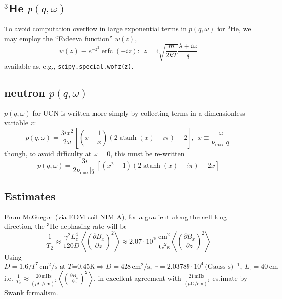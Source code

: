 \documentclass[11pt,english]{article}
\begin{document}
\subsection{$^3$He $p(q,\omega)$}

To avoid computation overflow in large exponential terms in $p(q,\omega)$ for $^3$He,
	we may employ the ``Fadeeva function'' $w(z)$,
\begin{equation}
	w(z) \equiv e^{-z^2} \operatorname{erfc}(-iz); \ \ z = i \sqrt{\frac{m}{2kT}} \frac{\lambda+i\omega}{q}
\end{equation}
available as, e.g., \texttt{scipy.special.wofz(z)}.

\subsection{neutron $p(q,\omega)$}
$p(q,\omega)$ for UCN is written more simply by collecting terms in a dimensionless variable $x$:
\begin{equation}
	p(q,\omega) = \frac{3ix^2}{2\omega} \left[ \left(x - \frac{1}{x}\right)(2\operatorname{atanh}(x)-i\pi) - 2 \right],\ \
	x \equiv \frac{\omega}{\nu_\textrm{max}|q|}
\end{equation}
though, to avoid difficulty at $\omega = 0$, this must be re-written
\begin{equation}
	p(q,\omega) = \frac{3i}{2\nu_\textrm{max}|q|} \left[ \left(x^2 - 1\right)(2\operatorname{atanh}(x)-i\pi) - 2x \right]
\end{equation}


\subsection{Estimates}

From McGregor (via EDM coil NIM A), for a gradient along the cell long direction, the $^3$He dephasing rate will be
\begin{equation}
	\frac{1}{T_2} \approx \frac{\gamma^2 L_z^4}{120 D}\left\langle \left( \frac{\partial B_x}{\partial z} \right)^2 \right\rangle
	\approx 2.07 \cdot 10^{10} \frac{\text{cm}^2}{\text{G}^2\text{s}} \left\langle \left( \frac{\partial B_x}{\partial z} \right)^2 \right\rangle
\end{equation}
Using
\begin{equation}
	D = 1.6/T^7\,\textrm{cm$^2$/s at $T$=0.45K} \Rightarrow D = 428\,\textrm{cm$^2$/s},\
	\gamma = 2.03789 \cdot 10^4\,\textrm{(Gauss s)$^{-1}$},\ L_z = 40\,\textrm{cm}
\end{equation}
i.e. $\frac{1}{T_2} \approx \frac{20\,\textrm{mHz}}{(\mu\text{G}/\text{cm})^2}
	\left\langle \left( \frac{\partial B_x}{\partial z} \right)^2 \right\rangle$,
	in excellent agreement with $\frac{21\,\textrm{mHz}}{(\mu\text{G}/\text{cm})^2}$ estimate by Swank formalism.
\end{document}
